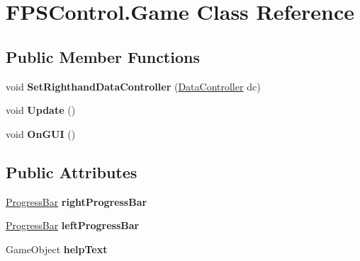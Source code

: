 \hypertarget{class_f_p_s_control_1_1_game}{\section{F\-P\-S\-Control.\-Game Class Reference}
\label{class_f_p_s_control_1_1_game}
}
\subsection*{Public Member Functions}
\begin{DoxyCompactItemize}
\item 
\hypertarget{class_f_p_s_control_1_1_game_a93da539578e0fbbcca9eac20003b4a1d}{void {\bfseries Set\-Righthand\-Data\-Controller} (\hyperlink{class_f_p_s_control_1_1_data_controller}{Data\-Controller} dc)}\label{class_f_p_s_control_1_1_game_a93da539578e0fbbcca9eac20003b4a1d}

\item 
\hypertarget{class_f_p_s_control_1_1_game_ab409204f251c3c96e7d932b7068da38f}{void {\bfseries Update} ()}\label{class_f_p_s_control_1_1_game_ab409204f251c3c96e7d932b7068da38f}

\item 
\hypertarget{class_f_p_s_control_1_1_game_a990ec674c828ee629228e10ec8e587c1}{void {\bfseries On\-G\-U\-I} ()}\label{class_f_p_s_control_1_1_game_a990ec674c828ee629228e10ec8e587c1}

\end{DoxyCompactItemize}
\subsection*{Public Attributes}
\begin{DoxyCompactItemize}
\item 
\hypertarget{class_f_p_s_control_1_1_game_aae52c8307b6e08da121aebff3bebee15}{\hyperlink{class_f_p_s_control_1_1_progress_bar}{Progress\-Bar} {\bfseries right\-Progress\-Bar}}\label{class_f_p_s_control_1_1_game_aae52c8307b6e08da121aebff3bebee15}

\item 
\hypertarget{class_f_p_s_control_1_1_game_a1bb0ada737ab6165cccddd5c6ca7ff5f}{\hyperlink{class_f_p_s_control_1_1_progress_bar}{Progress\-Bar} {\bfseries left\-Progress\-Bar}}\label{class_f_p_s_control_1_1_game_a1bb0ada737ab6165cccddd5c6ca7ff5f}

\item 
\hypertarget{class_f_p_s_control_1_1_game_a2ea92aacfde9d29aeeb61cbd9b6a9c95}{Game\-Object {\bfseries help\-Text}}\label{class_f_p_s_control_1_1_game_a2ea92aacfde9d29aeeb61cbd9b6a9c95}

\end{DoxyCompactItemize}
